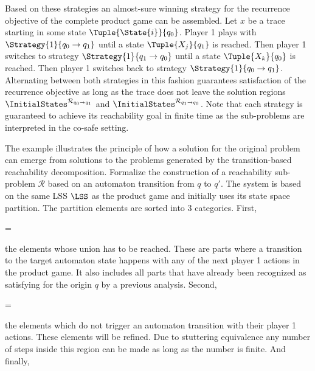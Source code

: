     Based on these strategies an almost-sure winning strategy for the recurrence objective of the complete product game can be assembled.
    Let $x$ be a trace starting in some state $\Tuple{\State{i}}{q_0}$.
    Player 1 plays with $\Strategy{1}{q_0 \rightarrow q_1}$ until a state $\Tuple{X_j}{q_1}$ is reached.
    Then player 1 switches to strategy $\Strategy{1}{q_1 \rightarrow q_0}$ until a state $\Tuple{X_k}{q_0}$ is reached.
    Then player 1 switches back to strategy $\Strategy{1}{q_0 \rightarrow q_1}$.
    Alternating between both strategies in this fashion guarantees satisfaction of the recurrence objective as long as the trace does not leave the solution regions $\InitialStates^{\mathcal{R}_{q_0 \rightarrow q_1}}$ and $\InitialStates^{\mathcal{R}_{q_1 \rightarrow q_0}}$.
    Note that each strategy is guaranteed to achieve its reachability goal in finite time as the sub-problems are interpreted in the co-safe setting.

    The example illustrates the principle of how a solution for the original problem can emerge from solutions to the problems generated by the transition-based reachability decomposition.
    Formalize the construction of a reachability sub-problem $\mathcal{R}$ based on an automaton transition from $q$ to $q'$.
    The system is based on the same LSS $\LSS$ as the product game and initially uses its state space partition.
    The partition elements are sorted into 3 categories.
    First,

    \startformula
         =  \EndComma
    \stopformula

    the elements whose union has to be reached.
    These are parts where a transition to the target automaton state happens with any of the next player 1 actions in the product game.
    It also includes all parts that have already been recognized as satisfying for the origin $q$ by a previous analysis.
    Second,

    \startformula
         =  \EndComma
    \stopformula

    the elements which do not trigger an automaton transition with their player 1 actions.
    These elements will be refined.
    Due to stuttering equivalence any number of steps inside this region can be made as long as the number is finite.
    And finally,

